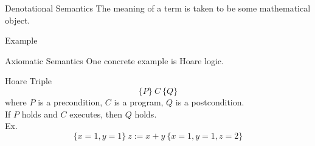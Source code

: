 \begin{frame}{Denotational Semantics}
The meaning of a term is taken to be some mathematical object.
\begin{block}{Example}
\end{block}
\end{frame}

\begin{frame}{Axiomatic Semantics}
One concrete example is Hoare logic.
\begin{block}{Hoare Triple}
$$\{P\}~C~\{Q\}$$
where $P$ is a precondition, $C$ is a program, $Q$ is a postcondition.\\
If $P$ holds and $C$ executes, then $Q$ holds.\\
Ex.
$$\{x=1, y=1\}~z:=x+y~\{x=1, y=1, z=2\}$$
\end{block}
\end{frame}

